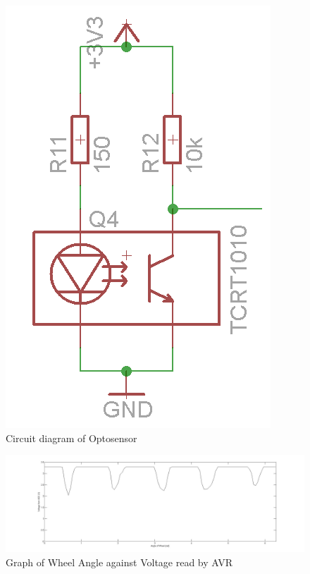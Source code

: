 
\begin{figure}
\centering
\caption{Circuit diagram of Optosensor}
\label{Circuit:TCRT1010}
\includegraphics[scale=0.5]{Figures/TCRT_Circuit.png}
\end{figure}

\begin{figure}
\caption{Graph of Wheel Angle against Voltage read by AVR}
\label{Graph:WheelVoltage}
\includegraphics[width = \textwidth]{Figures/WheelVoltageGraph.jpg}
\end{figure}


